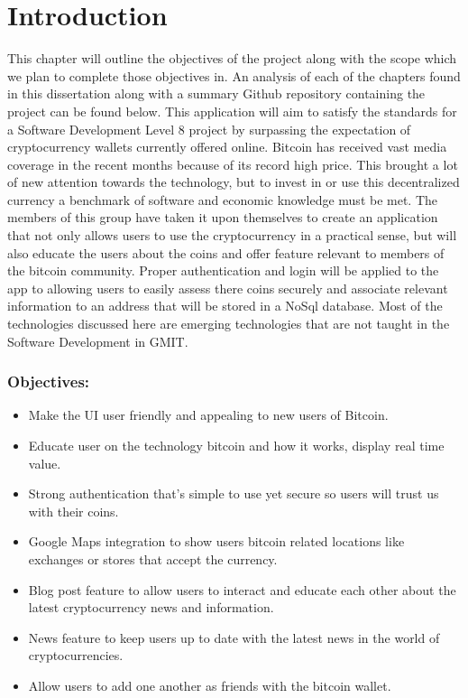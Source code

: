 \chapter{Introduction}
This chapter will outline the objectives of the project along with the scope which we plan to complete those objectives in. An analysis of each of the chapters found in this dissertation along with a summary Github repository containing the project can be found below. This application will aim to satisfy the standards for a Software Development Level 8 project by surpassing the expectation of cryptocurrency wallets currently offered online. Bitcoin has received vast media coverage in the recent months because of its record high price. This brought a lot of new attention towards the technology, but to invest in or use this decentralized currency a benchmark of software and economic knowledge must be met. The members of this group have taken it upon themselves to create an application that not only allows users to use the cryptocurrency in a practical sense, but will also educate the users about the coins and offer feature relevant to members of the bitcoin community. Proper authentication and login will be applied to the app to allowing users to easily assess there coins securely and associate relevant information to an address that will be stored in a NoSql database. Most of the technologies discussed here are emerging technologies that are not taught in the Software Development in GMIT.

\subsection{Objectives:}
\begin{itemize}
  \item Make the UI user friendly and appealing to new users of Bitcoin.
  \item Educate user on the technology bitcoin and how it works, display real time value.
  \item Strong authentication that’s simple to use yet secure so users will trust us with their coins.
  \item Google Maps integration to show users bitcoin related locations like exchanges or stores that accept the currency.
  \item Blog post feature to allow users to interact and educate each other about the latest cryptocurrency news and information.
  \item News feature to keep users up to date with the latest news in the world of cryptocurrencies.
  \item Allow users to add one another as friends with the bitcoin wallet.
\end{itemize}

